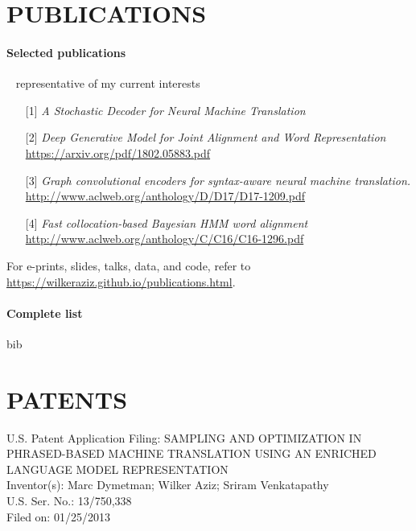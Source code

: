 \section*{PUBLICATIONS}




\paragraph{Selected publications} ~ representative of my current interests
\begin{itemize}
	\item[] [1] \emph{A Stochastic Decoder for Neural Machine Translation}
	\item[] [2] \emph{Deep Generative Model for Joint Alignment and Word Representation}\\
	\url{https://arxiv.org/pdf/1802.05883.pdf}
	\item[] [3] \emph{Graph convolutional encoders for syntax-aware neural machine translation.} \\
	\url{http://www.aclweb.org/anthology/D/D17/D17-1209.pdf}
	\item[] [4] \emph{Fast collocation-based Bayesian HMM word alignment} \\
	\url{http://www.aclweb.org/anthology/C/C16/C16-1296.pdf}
\end{itemize}

For e-prints, slides, talks, data, and code, refer to \url{https://wilkeraziz.github.io/publications.html}. 

\paragraph{Complete list}


\begin{btSect}{bib}
\btPrintNotCited
\end{btSect}


\section*{PATENTS}

\begin{description}
\item U.S. Patent Application Filing: SAMPLING AND OPTIMIZATION IN PHRASED-BASED MACHINE TRANSLATION USING AN ENRICHED LANGUAGE MODEL REPRESENTATION \\
Inventor(s): Marc Dymetman; Wilker Aziz; Sriram Venkatapathy \\
U.S. Ser. No.:  13/750,338 \\
Filed on: 01/25/2013 
\end{description}


